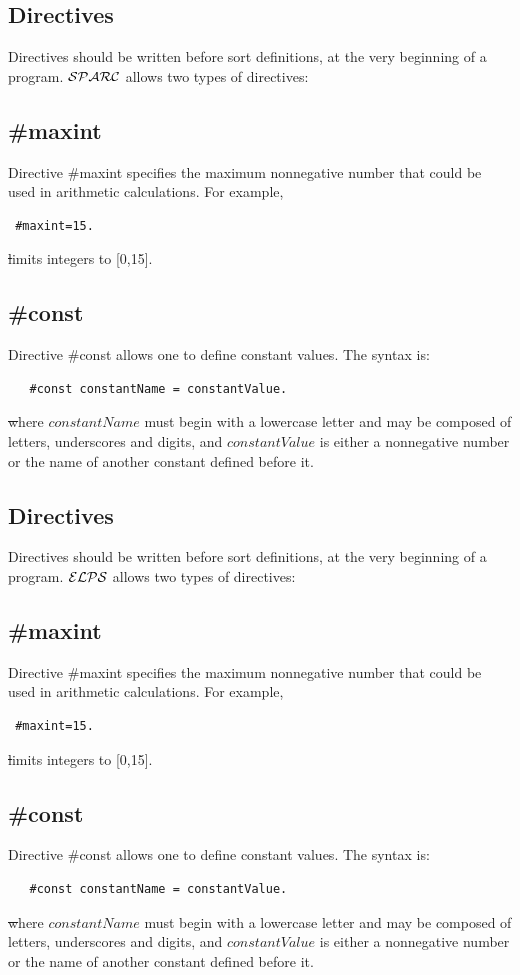 \documentclass[12pt, letterpaper]{article}
\begin{document}
\subsection{Directives}
Directives should be written before sort definitions, at the very beginning of a program.
${\cal SPARC}$ allows two types of directives:
\subsection*{\#maxint}
Directive \#maxint specifies the maximum nonnegative number that could be used in arithmetic calculations. For example,
\begin{verbatim}
 #maxint=15.
\end{verbatim}
\st limits integers to [0,15].
\subsection*{\#const}
Directive \#const allows one to define constant values. The syntax is:

\begin{verbatim}
   #const constantName = constantValue.
\end{verbatim}      
\st where $constantName$  must begin with a lowercase letter and may be composed of letters, underscores and digits,
 and $constantValue$ is either a nonnegative number or the name of another constant defined before it.  

\subsection{Directives}
Directives should be written before sort definitions, at the very beginning of a program.
${\cal ELPS}$ allows two types of directives:
\subsection*{\#maxint}
Directive \#maxint specifies the maximum nonnegative number that could be used in arithmetic calculations.
For example,
\begin{verbatim}
 #maxint=15.
\end{verbatim}
\st limits integers to [0,15].
\subsection*{\#const}
Directive \#const allows one to define constant values. The syntax is:

\begin{verbatim}
   #const constantName = constantValue.
\end{verbatim}      
\st where $constantName$  must begin with a lowercase letter and may be composed of letters, underscores and digits,
 and $constantValue$ is either a nonnegative number or the name of another constant defined before it.  
\end{document}

